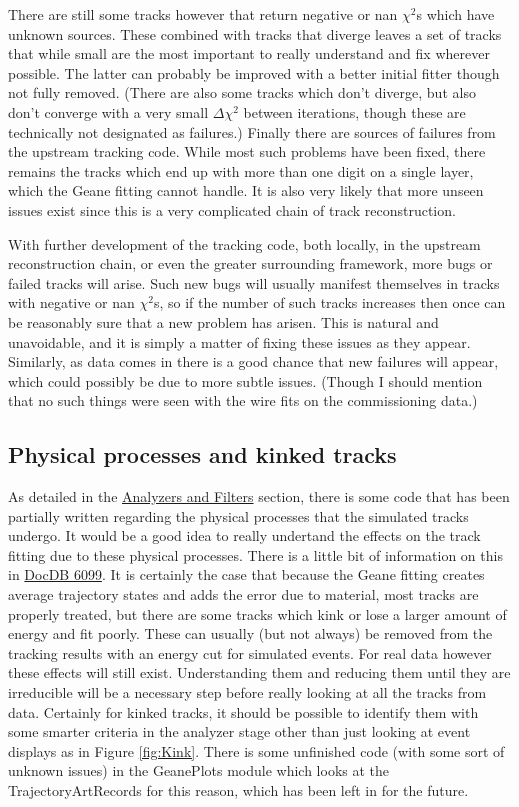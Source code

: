 		There are still some tracks however that return negative or nan $\chi^{2}$s which have unknown sources. These combined with tracks that diverge leaves a set of tracks that while small are the most important to really understand and fix wherever possible. The latter can probably be improved with a better initial fitter though not fully removed. (There are also some tracks which don't diverge, but also don't converge with a very small $\Delta\chi^{2}$ between iterations, though these are technically not designated as failures.) Finally there are sources of failures from the upstream tracking code. While most such problems have been fixed, there remains the tracks which end up with more than one digit on a single layer, which the Geane fitting cannot handle. It is also very likely that more unseen issues exist since this is a very complicated chain of track reconstruction.

		With further development of the tracking code, both locally, in the upstream reconstruction chain, or even the greater surrounding framework, more bugs or failed tracks will arise. Such new bugs will usually manifest themselves in tracks with negative or nan $\chi^{2}$s, so if the number of such tracks increases then once can be reasonably sure that a new problem has arisen. This is natural and unavoidable, and it is simply a matter of fixing these issues as they appear. Similarly, as data comes in there is a good chance that new failures will appear, which could possibly be due to more subtle issues. (Though I should mention that no such things were seen with the wire fits on the commissioning data.)

	\subsection{Physical processes and kinked tracks}

		As detailed in the \hyperref[sec:AnaFilt]{Analyzers and Filters} section, there is some code that has been partially written regarding the physical processes that the simulated tracks undergo. It would be a good idea to really undertand the effects on the track fitting due to these physical processes. There is a little bit of information on this in \href{https://gm2-docdb.fnal.gov/cgi-bin/private/ShowDocument?docid=6099}{DocDB 6099}. It is certainly the case that because the Geane fitting creates average trajectory states and adds the error due to material, most tracks are properly treated, but there are some tracks which kink or lose a larger amount of energy and fit poorly. These can usually (but not always) be removed from the tracking results with an energy cut for simulated events. For real data however these effects will still exist. Understanding them and reducing them until they are irreducible will be a necessary step before really looking at all the tracks from data. Certainly for kinked tracks, it should be possible to identify them with some smarter criteria in the analyzer stage other than just looking at event displays as in Figure \ref{fig:Kink}. There is some unfinished code (with some sort of unknown issues) in the GeanePlots module which looks at the TrajectoryArtRecords for this reason, which has been left in for the future.

